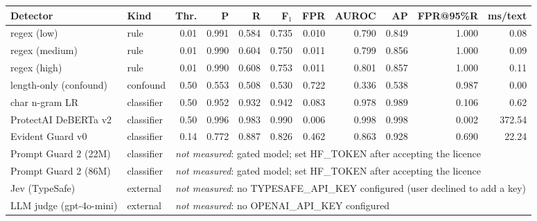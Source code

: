 \begin{tabular}{@{}llrrrrrrrrr@{}}
\toprule
Detector & Kind & Thr. & P & R & F$_1$ & FPR & AUROC & AP & FPR@95\%R & ms/text \\
\midrule
regex (low) & rule & 0.01 & 0.991 & 0.584 & 0.735 & 0.010 & 0.790 & 0.849 & 1.000 & 0.08 \\
regex (medium) & rule & 0.01 & 0.990 & 0.604 & 0.750 & 0.011 & 0.799 & 0.856 & 1.000 & 0.09 \\
regex (high) & rule & 0.01 & 0.990 & 0.608 & 0.753 & 0.011 & 0.801 & 0.857 & 1.000 & 0.11 \\
length-only (confound) & confound & 0.50 & 0.553 & 0.508 & 0.530 & 0.722 & 0.336 & 0.538 & 0.987 & 0.00 \\
char n-gram LR & classifier & 0.50 & 0.952 & 0.932 & 0.942 & 0.083 & 0.978 & 0.989 & 0.106 & 0.62 \\
ProtectAI DeBERTa v2 & classifier & 0.50 & 0.996 & 0.983 & 0.990 & 0.006 & 0.998 & 0.998 & 0.002 & 372.54 \\
Evident Guard v0 & classifier & 0.14 & 0.772 & 0.887 & 0.826 & 0.462 & 0.863 & 0.928 & 0.690 & 22.24 \\
\midrule
Prompt Guard 2 (22M) & classifier & \multicolumn{9}{l}{\emph{not measured}: gated model; set HF\_TOKEN after accepting the licence} \\
Prompt Guard 2 (86M) & classifier & \multicolumn{9}{l}{\emph{not measured}: gated model; set HF\_TOKEN after accepting the licence} \\
Jev (TypeSafe) & external & \multicolumn{9}{l}{\emph{not measured}: no TYPESAFE\_API\_KEY configured (user declined to add a key)} \\
LLM judge (gpt-4o-mini) & external & \multicolumn{9}{l}{\emph{not measured}: no OPENAI\_API\_KEY configured} \\
\bottomrule
\end{tabular}
